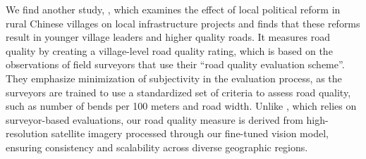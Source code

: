 We find another study, \cite{wong2017local}, which examines the effect of local political reform in rural Chinese villages on local infrastructure projects and finds that these reforms result in younger village leaders and higher quality roads. It measures road quality by creating a village-level road quality rating, which is based on the observations of field surveyors that use their ``road quality evaluation scheme''. They emphasize minimization of subjectivity in the evaluation process, as the surveyors are trained to use a standardized set of criteria to assess road quality, such as number of bends per 100 meters and road width. Unlike \cite{wong2017local}, which relies on surveyor-based evaluations, our road quality measure is derived from high-resolution satellite imagery processed through our fine-tuned vision model, ensuring consistency and scalability across diverse geographic regions.



